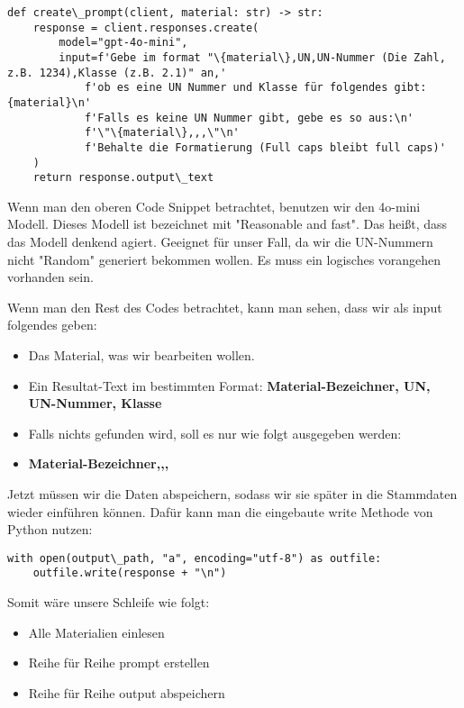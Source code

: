 \begin{lstlisting}
def create\_prompt(client, material: str) -> str:
    response = client.responses.create(
        model="gpt-4o-mini",
        input=f'Gebe im format "\{material\},UN,UN-Nummer (Die Zahl, z.B. 1234),Klasse (z.B. 2.1)" an,'
            f'ob es eine UN Nummer und Klasse für folgendes gibt: {material}\n'
            f'Falls es keine UN Nummer gibt, gebe es so aus:\n'
            f'\"\{material\},,,\"\n'
            f'Behalte die Formatierung (Full caps bleibt full caps)'
    )
    return response.output\_text
\end{lstlisting}

Wenn man den oberen Code Snippet betrachtet, benutzen wir den 4o-mini Modell.
Dieses Modell ist bezeichnet mit "Reasonable and fast". Das heißt, dass das Modell
denkend agiert. Geeignet für unser Fall, da wir die UN-Nummern
nicht "Random" generiert bekommen wollen. Es muss ein logisches vorangehen vorhanden sein.

Wenn man den Rest des Codes betrachtet, kann man sehen, dass wir als input folgendes geben:
\begin{itemize}
    \item Das Material, was wir bearbeiten wollen.
    \item Ein Resultat-Text im bestimmten Format: \textbf{Material-Bezeichner, UN, UN-Nummer, Klasse}
    \item Falls nichts gefunden wird, soll es nur wie folgt ausgegeben werden:
    \item \textbf{Material-Bezeichner,,,}
\end{itemize}

Jetzt müssen wir die Daten abspeichern, sodass wir sie später in die Stammdaten wieder
einführen können. Dafür kann man die eingebaute write Methode von Python nutzen:

\begin{lstlisting}
with open(output\_path, "a", encoding="utf-8") as outfile:
    outfile.write(response + "\n")
\end{lstlisting}

Somit wäre unsere Schleife wie folgt:

\begin{itemize}
    \item Alle Materialien einlesen
    \item Reihe für Reihe prompt erstellen
    \item Reihe für Reihe output abspeichern
\end{itemize}

